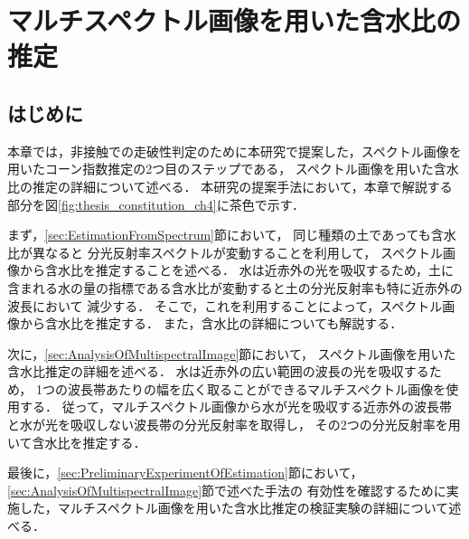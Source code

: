 \chapter{マルチスペクトル画像を用いた含水比の推定}
\thispagestyle{empty}
\label{ch:WaterContentEstimation}
\minitoc


\newpage

\section{はじめに}

本章では，非接触での走破性判定のために本研究で提案した，スペクトル画像を用いたコーン指数推定の2つ目のステップである，
スペクトル画像を用いた含水比の推定の詳細について述べる．
本研究の提案手法において，本章で解説する部分を図\ref{fig:thesis_constitution_ch4}に茶色で示す．


まず，\ref{sec:EstimationFromSpectrum}節において，
同じ種類の土であっても含水比が異なると
分光反射率スペクトルが変動することを利用して，
スペクトル画像から含水比を推定することを述べる．
水は近赤外の光を吸収するため，土に含まれる水の量の指標である含水比が変動すると土の分光反射率も特に近赤外の波長において
減少する．
そこで，これを利用することによって，スペクトル画像から含水比を推定する．%
また，含水比の詳細についても解説する．

次に，\ref{sec:AnalysisOfMultispectralImage}節において，
スペクトル画像を用いた含水比推定の詳細を述べる．
水は近赤外の広い範囲の波長の光を吸収するため，
1つの波長帯あたりの幅を広く取ることができるマルチスペクトル画像を使用する．
従って，マルチスペクトル画像から水が光を吸収する近赤外の波長帯と水が光を吸収しない波長帯の分光反射率を取得し，
その2つの分光反射率を用いて含水比を推定する．

最後に，\ref{sec:PreliminaryExperimentOfEstimation}節において，
\ref{sec:AnalysisOfMultispectralImage}節で述べた手法の
有効性を確認するために実施した，マルチスペクトル画像を用いた含水比推定の検証実験の詳細について述べる．%

